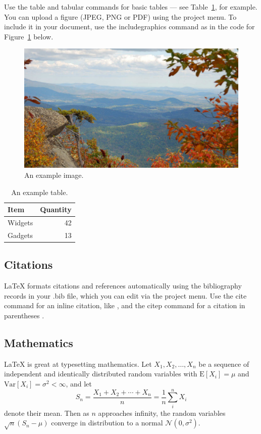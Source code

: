 \documentclass[fleqn,10pt,lineno]{wlpeerj} %
\begin{document}
Use the table and tabular commands for basic tables --- see Table~\ref{tab:widgets}, for example. You can upload a figure (JPEG, PNG or PDF) using the project menu. To include it in your document, use the includegraphics command as in the code for Figure~\ref{fig:view} below.

\begin{figure}[ht]
\centering
\includegraphics[width=\linewidth]{view.jpg}
\caption{An example image.}
\label{fig:view}
\end{figure}

\begin{table}[ht]
\centering
\begin{tabular}{l|r}
Item & Quantity \\\hline
Widgets & 42 \\
Gadgets & 13
\end{tabular}
\caption{\label{tab:widgets}An example table.}
\end{table}

\subsection*{Citations}

LaTeX formats citations and references automatically using the bibliography records in your .bib file, which you can edit via the project menu. Use the cite command for an inline citation, like \cite{Figueredo:2009dg}, and the citep command for a citation in parentheses \citep{Figueredo:2009dg}.

\subsection*{Mathematics}

\LaTeX{} is great at typesetting mathematics. Let $X_1, X_2, \ldots, X_n$ be a sequence of independent and identically distributed random variables with $\text{E}[X_i] = \mu$ and $\text{Var}[X_i] = \sigma^2 < \infty$, and let
$$S_n = \frac{X_1 + X_2 + \cdots + X_n}{n}
      = \frac{1}{n}\sum_{i}^{n} X_i$$
denote their mean. Then as $n$ approaches infinity, the random variables $\sqrt{n}(S_n - \mu)$ converge in distribution to a normal $\mathcal{N}(0, \sigma^2)$.
\end{document}
